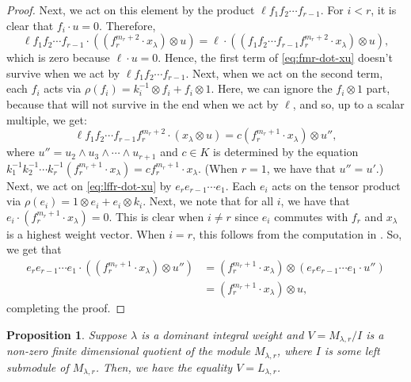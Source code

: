 \documentclass{amsart}
\numberwithin{equation}{section}
\theoremstyle{theorem}
\newtheorem{proposition}[theorem]{Proposition}
\theoremstyle{definition}
\begin{document}
\begin{proof}
Next, we act on this element by the product $\ell f_1 f_2\cdots f_{r-1}$. For $i<r$, it is clear that $f_i\cdot u=0$. Therefore, 
\[\ell f_1f_2\cdots f_{r-1} \cdot ((f_r^{m_r+2} \cdot x_{\lambda})\otimes u) = \ell\cdot ((f_1 f_2\cdots f_{r-1} f_r^{m_r+2} \cdot x_{\lambda})\otimes u),\]
which is zero because $\ell\cdot u=0$. Hence, the first term of \eqref{eq:fmr-dot-xu} %
doesn't survive when we act by $\ell f_1 f_2\cdots f_{r-1}$. Next, when we act on the second term, each $f_i$ acts via $\rho(f_i)=k_i^{-1}\otimes f_i + f_i \otimes 1$. Here, we can ignore the $f_i\otimes 1$ part, because that will not survive in the end when we act by $\ell$, and so, up to a scalar multiple, we get:
\begin{equation}\label{eq:lffr-dot-xu}\ell f_1 f_2\cdots f_{r-1}f_r^{m_r+2}\cdot (x_\lambda\otimes u)=c(f_r^{m_r+1} \cdot x_{\lambda}) \otimes u'',\end{equation}
where $u''=u_2\wedge u_3\wedge\cdots \wedge u_{r+1}$ and $c\in K$ is determined by the equation $k_1^{-1}k_2^{-1}\cdots k_{r}^{-1}(f_r^{m_r+1} \cdot x_{\lambda})=cf_r^{m_r+1} \cdot x_{\lambda}$. (When $r=1$, we have that $u''=u'$.) Next, we act on \eqref{eq:lffr-dot-xu} %
by $e_r e_{r-1}\cdots e_1$. Each $e_i$ acts on the tensor product via $\rho(e_i)=1\otimes e_i + e_i\otimes k_i$. Next, we note that for all $i$, we have that $e_i\cdot( f_r^{m_r+1} \cdot x_{\lambda}) = 0$. This is clear when $i\neq r$ since $e_i$ commutes with $f_r$ and $x_{\lambda}$ is a highest weight vector. When $i=r$, this follows from the computation in \cite[Lemma 5.6]{J}. So, we get that 
\begin{align*}e_r e_{r-1}\cdots e_1\cdot ((f_r^{m_r+1} \cdot x_{\lambda}) \otimes u'') &= (f_r^{m_r+1} \cdot x_{\lambda}) \otimes (e_r e_{r-1}\cdots e_1\cdot u'')\\&= (f_r^{m_r+1} \cdot x_{\lambda}) \otimes u,\end{align*}
completing the proof.
\end{proof}

\begin{proposition}\label{prop:unique}
Suppose $\lambda$ is a dominant integral weight and $V=M_{\lambda,r}/I$ is a non-zero finite dimensional quotient of the module $M_{\lambda,r}$, where $I$ is some left submodule of $M_{\lambda,r}$. Then, we have the equality $V=L_{\lambda, r}$.
\end{proposition}
\end{document}
